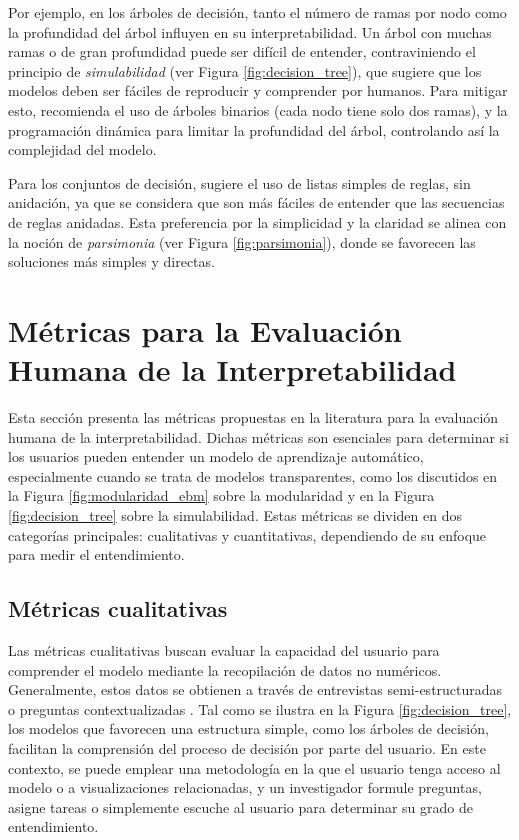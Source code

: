 Por ejemplo, en los árboles de decisión, tanto el número de ramas por nodo como la profundidad del árbol influyen en su interpretabilidad. Un árbol con muchas ramas o de gran profundidad puede ser difícil de entender, contraviniendo el principio de \textit{simulabilidad} (ver Figura \ref{fig:decision_tree}), que sugiere que los modelos deben ser fáciles de reproducir y comprender por humanos. Para mitigar esto, \cite{Lin-2020} recomienda el uso de árboles binarios (cada nodo tiene solo dos ramas), y la programación dinámica para limitar la profundidad del árbol, controlando así la complejidad del modelo.

Para los conjuntos de decisión, \cite{lakkaraju-2016} sugiere el uso de listas simples de reglas, sin anidación, ya que se considera que son más fáciles de entender que las secuencias de reglas anidadas. Esta preferencia por la simplicidad y la claridad se alinea con la noción de \textit{parsimonia} (ver Figura \ref{fig:parsimonia}), donde se favorecen las soluciones más simples y directas.




\section{Métricas para la Evaluación Humana de la Interpretabilidad}

Esta sección presenta las métricas propuestas en la literatura para la evaluación humana de la interpretabilidad. Dichas métricas son esenciales para determinar si los usuarios pueden entender un modelo de aprendizaje automático, especialmente cuando se trata de modelos transparentes, como los discutidos en la Figura \ref{fig:modularidad_ebm} sobre la modularidad y en la Figura \ref{fig:decision_tree} sobre la simulabilidad. Estas métricas se dividen en dos categorías principales: cualitativas y cuantitativas, dependiendo de su enfoque para medir el entendimiento.

\subsection{Métricas cualitativas}

Las métricas cualitativas buscan evaluar la capacidad del usuario para comprender el modelo mediante la recopilación de datos no numéricos. Generalmente, estos datos se obtienen a través de entrevistas semi-estructuradas o preguntas contextualizadas \cite{Kaur-2020}. Tal como se ilustra en la Figura \ref{fig:decision_tree}, los modelos que favorecen una estructura simple, como los árboles de decisión, facilitan la comprensión del proceso de decisión por parte del usuario. En este contexto, se puede emplear una metodología en la que el usuario tenga acceso al modelo o a visualizaciones relacionadas, y un investigador formule preguntas, asigne tareas o simplemente escuche al usuario para determinar su grado de entendimiento.

